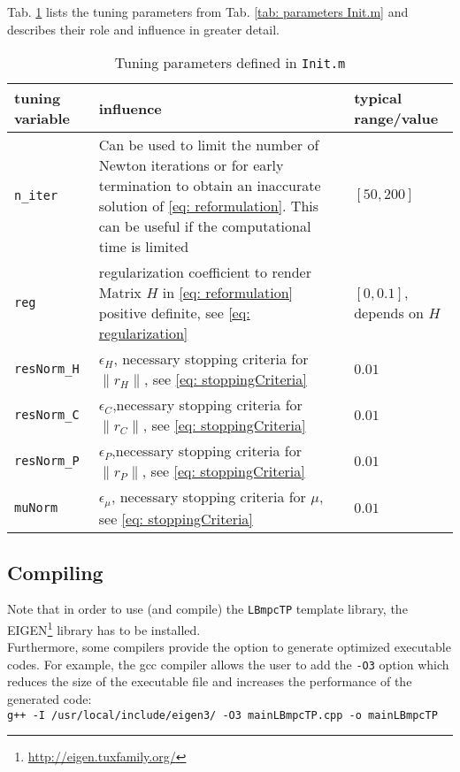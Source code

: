 \documentclass[letter]{article}
\begin{document}
\begin{sffamily}
\noindent
Tab. \ref{tab: tuning parameters} lists the tuning parameters from Tab. \ref{tab: parameters Init.m} and describes their role and influence in greater detail.

\begin{table}[!htdp]
\caption{Tuning parameters defined in \texttt{Init.m}}
\begin{center}
\begin{tabular}{|p{3.5cm}|p{10cm}|p{3cm}|}\hline
{
	\bf tuning variable} & influence & typical range/value \\ \hline\hline

  \texttt{n\_iter} & Can be used to limit the number of Newton iterations or for early termination to  obtain an inaccurate solution of \eqref{eq: reformulation}. This can be useful if the computational time is limited & $[50,200]$ \\ \hline
 \texttt{reg} & regularization coefficient to render Matrix $H$ in \eqref{eq: reformulation} positive definite, see \eqref{eq: regularization}  & $[0,0.1]$, depends on $H$ \\ \hline
 \texttt{resNorm\_H} & $\epsilon_H$, necessary stopping criteria for $\|r_H\|$, see \eqref{eq: stoppingCriteria} & $0.01$ \\ \hline
 \texttt{resNorm\_C} & $\epsilon_C$,necessary stopping criteria for $\|r_C\|$, see \eqref{eq: stoppingCriteria} & $0.01$ \\ \hline
 \texttt{resNorm\_P} & $\epsilon_P$,necessary stopping criteria for $\|r_P\|$, see \eqref{eq: stoppingCriteria} & $0.01$ \\ \hline
 \texttt{muNorm} & $\epsilon_\mu$, necessary stopping criteria for $\mu$, see \eqref{eq: stoppingCriteria} & $0.01$ \\ \hline
\end{tabular}
\end{center}
\label{tab: tuning parameters}
\end{table}


\subsection{Compiling}
Note that in order to use (and compile) the \texttt{LBmpcTP} template library, the EIGEN\footnote{\url{http://eigen.tuxfamily.org/}} library has to be installed.\\

\noindent
Furthermore, some compilers provide the option to generate optimized executable codes. For example, the gcc compiler allows the user to add the \texttt{-O3} option which  reduces the size of the executable file and increases the performance of the generated code: \\
\noindent
\texttt{g++ -I /usr/local/include/eigen3/ -O3 mainLBmpcTP.cpp -o mainLBmpcTP}


\end{sffamily}
\end{document}
